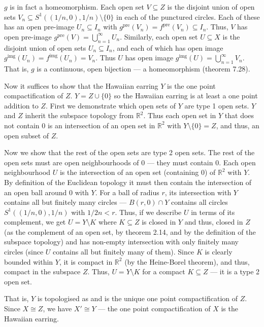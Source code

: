 \documentclass[12 pt, letterpaper]{hmcpset}
\begin{document}
\begin{solution}
\begin{enumerate}
			$g$ is in fact a homeomorphism. Each open set $V \subseteq Z$ is the disjoint union of open sets $V_{n} \subseteq S^{1}((1/n, 0), 1/n) \setminus \{ 0 \}$ in each of the punctured circles. Each of these has an open pre-image $U_{n} \subseteq I_{n}$ with $g^{\text{pre}}(V_{n}) = f^{\text{pre}}(V_{n}) \subseteq I_{n}$. Thus, $V$ has open pre-image $g^{\text{pre}}(V) = \bigcup_{n = 1}^{\infty} U_{n}$. Similarly, each open set $U \subseteq X$ is the disjoint union of open sets $U_{n} \subseteq I_{n}$, and each of which has open image $g^{\text{img}}(U_{n}) = f^{\text{img}}(U_{n}) = V_{n}$. Thus $U$ has open image $g^{\text{img}}(U) = \bigcup_{n = 1}^{\infty} V_{n}$. That is, $g$ is a continuous, open bijection --- a homeomorphism (theorem 7.28).

			Now it suffices to show that the Hawaiian earring $Y$ is the one point compactification of $Z$. $Y = Z \cup \{ 0 \}$ so the Hawaiian earring is at least a one point addition to $Z$. First we demonstrate which open sets of $Y$ are type 1 open sets. $Y$ and $Z$ inherit the subspace topology from $\mathbb{R}^{2}$. Thus each open set in $Y$ that does not contain $0$ is an intersection of an open set in $\mathbb{R}^{2}$ with $Y \setminus \{ 0 \} = Z$, and thus, an open subset of $Z$.

			Now we show that the rest of the open sets are type 2 open sets. The rest of the open sets must are open neighbourhoods of $0$ --- they must contain $0$. Each open neighbourhood $U$ is the intersection of an open set (containing $0$) of $\mathbb{R}^{2}$ with $Y$. By definition of the Euclidean topology it must then contain the intersection of an open ball around $0$ with $Y$. For a ball of radius $r$, its intersection with $Y$ contains all but finitely many circles --- $B(r, 0) \cap Y$ contains all circles $S^{1}((1/n, 0), 1/n)$ with $1/2n < r$. Thus, if we describe $U$ in terms of its complement, we get $U = Y \setminus K$ where $K \subseteq Z$ is closed in $Y$ and thus, closed in $Z$ (as the complement of an open set, by theorem 2.14, and by the definition of the subspace topology) and has non-empty intersection with only finitely many circles (since $U$ contains all but finitely many of them). Since $K$ is clearly bounded within $Y$, it is compact in $\mathbb{R}^{2}$ (by the Heine-Borel theorem), and thus, compact in the subspace $Z$. Thus, $U = Y \setminus K$ for a compact $K \subseteq Z$ --- it is a type 2 open set.

			That is, $Y$ is topologised as and is the unique one point compactification of $Z$. Since $X \cong Z$, we have $X' \cong Y$ --- the one point compactification of $X$ is the Hawaiian earring.
	\end{enumerate}
\end{solution}
\end{document}
